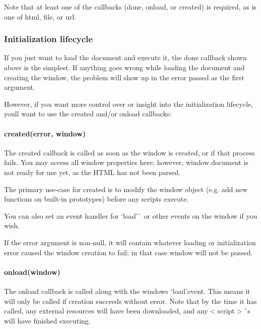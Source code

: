 Note that at least one of the callbacks ({\ttfamily done}, {\ttfamily onload}, or {\ttfamily created}) is required, as is one of {\ttfamily html}, {\ttfamily file}, or {\ttfamily url}.

\subsubsection*{Initialization lifecycle}

If you just want to load the document and execute it, the {\ttfamily done} callback shown above is the simplest. If anything goes wrong while loading the document and creating the window, the problem will show up in the {\ttfamily error} passed as the first argument.

However, if you want more control over or insight into the initialization lifecycle, you\textquotesingle{}ll want to use the {\ttfamily created} and/or {\ttfamily onload} callbacks\+:

\paragraph*{{\ttfamily created(error, window)}}

The {\ttfamily created} callback is called as soon as the window is created, or if that process fails. You may access all {\ttfamily window} properties here; however, {\ttfamily window.\+document} is not ready for use yet, as the H\+T\+ML has not been parsed.

The primary use-\/case for {\ttfamily created} is to modify the window object (e.\+g. add new functions on built-\/in prototypes) before any scripts execute.

You can also set an event handler for `\textquotesingle{}load'\`{} or other events on the window if you wish.

If the {\ttfamily error} argument is non-\/{\ttfamily null}, it will contain whatever loading or initialization error caused the window creation to fail; in that case {\ttfamily window} will not be passed.

\paragraph*{{\ttfamily onload(window)}}

The {\ttfamily onload} callback is called along with the window\textquotesingle{}s `\textquotesingle{}load'{\ttfamily event. This means it will only be called if creation succeeds without error. Note that by the time it has called, any external resources will have been downloaded, and any}$<$script$>$\`{}s will have finished executing.

